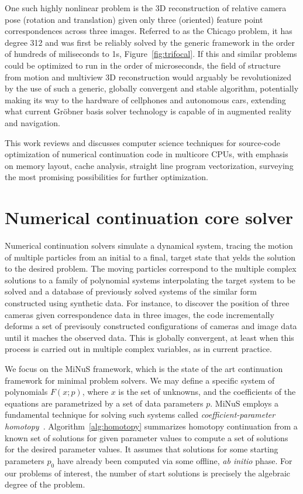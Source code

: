 \documentclass[10pt,conference]{IEEEtran}
\newcommand{\param}{p}
\begin{document}
One such highly nonlinear problem is the 3D reconstruction of relative camera
pose (rotation and translation) given only three (oriented) feature point
correspondences across three images. Referred to as the Chicago problem, it has degree 312 and was first be
reliably solved by the generic framework in the order of hundreds of miliseconds
to 1s, Figure~\ref{fig:trifocal}. If this and similar problems could be
optimized to run in the order of microseconds, the field of structure from
motion and multiview 3D reconstruction would arguably be revolutionized by the
use of such a generic, globally convergent and stable algorithm, potentially
making its way to the hardware of cellphones and autonomous cars, extending what
current Gr\"obner basis solver technology is capable of in augmented reality and
navigation.

This work reviews and discusses computer science techniques for source-code
optimization of numerical continuation code in multicore CPUs, with emphasis on
memory layout, cache analysis, straight line program vectorization, surveying
the most promising possibilities for further optimization. 

\section{Numerical continuation core solver}

Numerical continuation solvers simulate a dynamical system, tracing the motion
of multiple particles from an initial to a final, target state that yelds the
solution to the desired problem. The moving particles correspond to the multiple
complex solutions to a family of polynomial systems interpolating the target
system to be solved and a database of previously solved systems of the similar
form constructed using synthetic data. For instance, to discover the position of
three cameras given correspondence data in three images, the code incrementally
deforms a set of previsouly constructed configurations of cameras and image data
until it maches the observed data. This is globally convergent, at least when
this process is carried out in multiple complex variables, as in current
practice.

We focus on the MiNuS framework, which is the state of the art continuation
framework for minimal problem solvers. We may define a specific system of
polynomials $F(x;\param)$, where $x$ is the set of
unknowns, and the coefficients of the equations are parametrized by a set of
data parameters $\param$.
MiNuS employs a fundamental technique for solving such systems called
\emph{coefficient-parameter homotopy}~\cite{SWbook}.
Algorithm~\ref{alg:homotopy} summarizes homotopy continuation from a known set
of solutions for given parameter values to compute a set of solutions for the
desired parameter values. It assumes that solutions for some starting parameters
$\param_0$ have already been computed via some offline, \emph{ab initio}
phase. For our problems of interest, the number of start solutions is precisely
the algebraic degree of the problem. 
\end{document}
